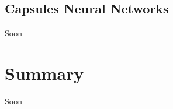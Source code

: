 \vspace{-0.3cm}

\subsection{Capsules Neural Networks}\label{sec:3.8.4}
\vspace{-0.5cm}
\noindent Soon


\vspace{-0.3cm}




\section{Summary}\label{sec:3.9}
\vspace{-0.5cm}
\noindent Soon

\vspace{-0.3cm}



